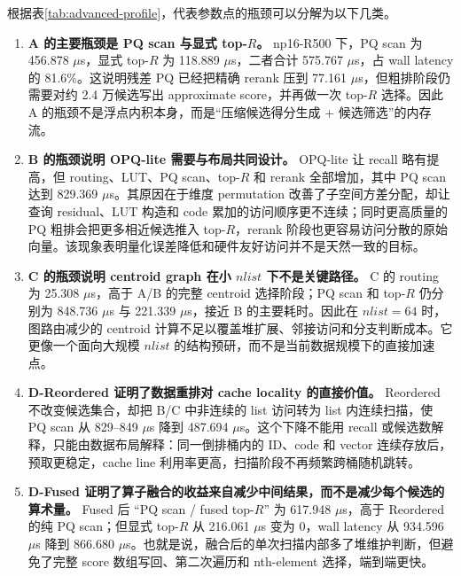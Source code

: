 \documentclass[a4paper]{article}
\begin{document}
根据表\ref{tab:advanced-profile}，代表参数点的瓶颈可以分解为以下几类。
\begin{enumerate}
\item \textbf{A 的主要瓶颈是 PQ scan 与显式 top-$R$。} np16-R500 下，PQ scan 为 456.878 $\mu$s，显式 top-$R$ 为 118.889 $\mu$s，二者合计 575.767 $\mu$s，占 wall latency 的 81.6\%。这说明残差 PQ 已经把精确 rerank 压到 77.161 $\mu$s，但粗排阶段仍需要对约 2.4 万候选写出 approximate score，并再做一次 top-$R$ 选择。因此 A 的瓶颈不是浮点内积本身，而是“压缩候选得分生成 + 候选筛选”的内存流。
\item \textbf{B 的瓶颈说明 OPQ-lite 需要与布局共同设计。} OPQ-lite 让 recall 略有提高，但 routing、LUT、PQ scan、top-$R$ 和 rerank 全部增加，其中 PQ scan 达到 829.369 $\mu$s。其原因在于维度 permutation 改善了子空间方差分配，却让查询 residual、LUT 构造和 code 累加的访问顺序更不连续；同时更高质量的 PQ 粗排会把更多相近候选推入 top-$R$，rerank 阶段也更容易访问分散的原始向量。该现象表明量化误差降低和硬件友好访问并不是天然一致的目标。
\item \textbf{C 的瓶颈说明 centroid graph 在小 $nlist$ 下不是关键路径。} C 的 routing 为 25.308 $\mu$s，高于 A/B 的完整 centroid 选择阶段；PQ scan 和 top-$R$ 仍分别为 848.736 $\mu$s 与 221.339 $\mu$s，接近 B 的主要耗时。因此在 $nlist=64$ 时，图路由减少的 centroid 计算不足以覆盖堆扩展、邻接访问和分支判断成本。它更像一个面向大规模 $nlist$ 的结构预研，而不是当前数据规模下的直接加速点。
\item \textbf{D-Reordered 证明了数据重排对 cache locality 的直接价值。} Reordered 不改变候选集合，却把 B/C 中非连续的 list 访问转为 list 内连续扫描，使 PQ scan 从 829--849 $\mu$s 降到 487.694 $\mu$s。这个下降不能用 recall 或候选数解释，只能由数据布局解释：同一倒排桶内的 ID、code 和 vector 连续存放后，预取更稳定，cache line 利用率更高，扫描阶段不再频繁跨桶随机跳转。
\item \textbf{D-Fused 证明了算子融合的收益来自减少中间结果，而不是减少每个候选的算术量。} Fused 后 ``PQ scan / fused top-$R$'' 为 617.948 $\mu$s，高于 Reordered 的纯 PQ scan；但显式 top-$R$ 从 216.061 $\mu$s 变为 0，wall latency 从 934.596 $\mu$s 降到 866.680 $\mu$s。也就是说，融合后的单次扫描内部多了堆维护判断，但避免了完整 score 数组写回、第二次遍历和 nth-element 选择，端到端更快。
\end{enumerate}
\end{document}
